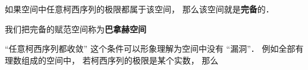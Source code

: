 

如果空间中任意柯西序列的极限都属于该空间， 那么该空间就是\textbf{完备}的．

我们把完备的赋范空间称为\textbf{巴拿赫空间}



“任意柯西序列都收敛” 这个条件可以形象理解为空间中没有 “漏洞”． 例如全部有理数组成的空间中， 若柯西序列的极限是某个实数， 那么
